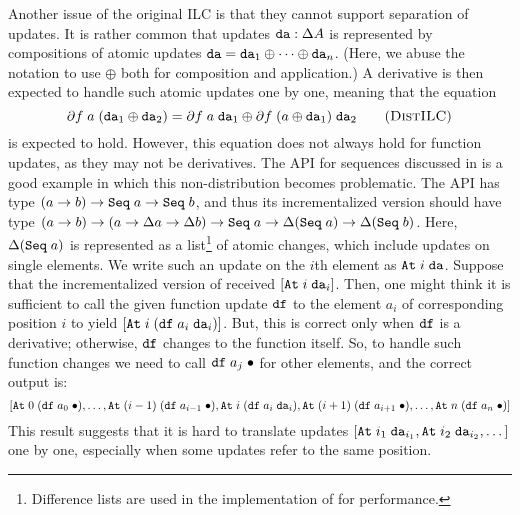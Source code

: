 \documentclass{article}
\theoremstyle{definition}
\begin{document}
Another issue of the original ILC is that they cannot support separation of updates. It is rather common that updates $\texttt{da} : \Delta A$
is represented by compositions of atomic updates $\texttt{da} = \texttt{da}_1 \oplus \dots \oplus \texttt{da}_n$.
(Here, we abuse the notation to use $\oplus$ both for composition and application.) 
A derivative is then expected to handle such atomic updates one by one, meaning that the equation 
\[
\partial f \A a \A (\var{da}_1 \oplus \var{da}_2) = \partial f \A a \A \var{da}_1 \oplus \partial f \A (a \oplus \var{da}_1) \A \var{da}_2 \tag{\textsc{DistILC}}\label{eq:dist-ilc}
\]
is expected to hold. However, this equation does not always hold for function updates, as they may not be derivatives. The  API for sequences discussed in 
\citet{GiarrussoRS19} is a good example in which this non-distribution becomes problematic. The API has type $(a \to b) \to \texttt{Seq} \; a \to \texttt{Seq} \; b$, 
and thus its incrementalized version should have type $(a \to b) \to (a \to \Delta a \to \Delta b) \to \texttt{Seq} \; a \to \Delta (\texttt{Seq} \; a) \to \Delta (\texttt{Seq} \; b)$. 
Here, $\Delta (\texttt{Seq} \; a)$ is represented as a list\footnote{Difference lists are used in the implementation of \citet{GiarrussoRS19} for performance.} of atomic changes, which include 
updates on single elements. We write such an update on the $i$th element as \(\texttt{At} \; i \; \texttt{da}\). 
Suppose that the incrementalized version of  received $[\texttt{At} \; i \; \texttt{da}_i]$. Then, one might think it is sufficient to call the given function update $\texttt{df}$ to the element $a_i$ of corresponding position $i$ to yield $[\texttt{At} \; i \; (\texttt{df} \; a_i \; \texttt{da}_i)]$. But, this is correct only when $\texttt{df}$ is a derivative; otherwise, $\texttt{df}$ changes to the function itself. 
So, to handle such function changes we need to call $\texttt{df} \; a_j \; {\bullet}$ for other elements, and the correct output is: 
\[
[ \texttt{At} \; 0 \; (\texttt{df} \; a_0 \; {\bullet}), \dots, \texttt{At} \; (i-1) \; (\texttt{df} \; a_{i-1} \; {\bullet}), \texttt{At} \; i \; (\texttt{df} \; a_i \; \texttt{da}_i), \texttt{At} \; (i+1) \; (\texttt{df} \; a_{i+1} \; {\bullet}), \dots, \texttt{At} \; n \; (\texttt{df} \; a_n \; {\bullet}) ]
\]
This result suggests that it is hard to translate updates $[\texttt{At} \; {i_1} \; \texttt{da}_{i_1}, \texttt{At} \; {i_2} \; \texttt{da}_{i_2},\dots]$ one by one, especially when some updates refer to the same position. 
\end{document}

